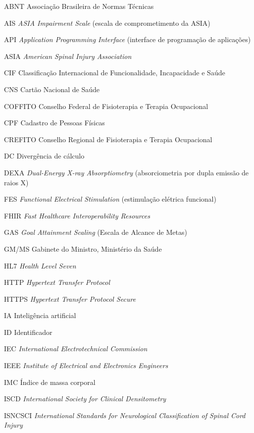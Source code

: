 \begin{siglas}
  \item[ABNT] Associação Brasileira de Normas Técnicas
  \item[AIS] \textit{ASIA Impairment Scale} (escala de comprometimento da ASIA)
  \item[API] \textit{Application Programming Interface} (interface de programação de aplicações)
  \item[ASIA] \textit{American Spinal Injury Association}
  \item[CIF] Classificação Internacional de Funcionalidade, Incapacidade e Saúde
  \item[CNS] Cartão Nacional de Saúde
  \item[COFFITO] Conselho Federal de Fisioterapia e Terapia Ocupacional
  \item[CPF] Cadastro de Pessoas Físicas
  \item[CREFITO] Conselho Regional de Fisioterapia e Terapia Ocupacional
  \item[DC] Divergência de cálculo
  \item[DEXA] \textit{Dual-Energy X-ray Absorptiometry} (absorciometria por dupla emissão de raios X)
  \item[FES] \textit{Functional Electrical Stimulation} (estimulação elétrica funcional)
  \item[FHIR] \textit{Fast Healthcare Interoperability Resources}
  \item[GAS] \textit{Goal Attainment Scaling} (Escala de Alcance de Metas)
  \item[GM/MS] Gabinete do Ministro, Ministério da Saúde
  \item[HL7] \textit{Health Level Seven}
  \item[HTTP] \textit{Hypertext Transfer Protocol}
  \item[HTTPS] \textit{Hypertext Transfer Protocol Secure}
  \item[IA] Inteligência artificial
  \item[ID] Identificador
  \item[IEC] \textit{International Electrotechnical Commission}
  \item[IEEE] \textit{Institute of Electrical and Electronics Engineers}
  \item[IMC] Índice de massa corporal
  \item[ISCD] \textit{International Society for Clinical Densitometry}
  \item[ISNCSCI] \textit{International Standards for Neurological Classification of Spinal Cord Injury}

\end{siglas}
